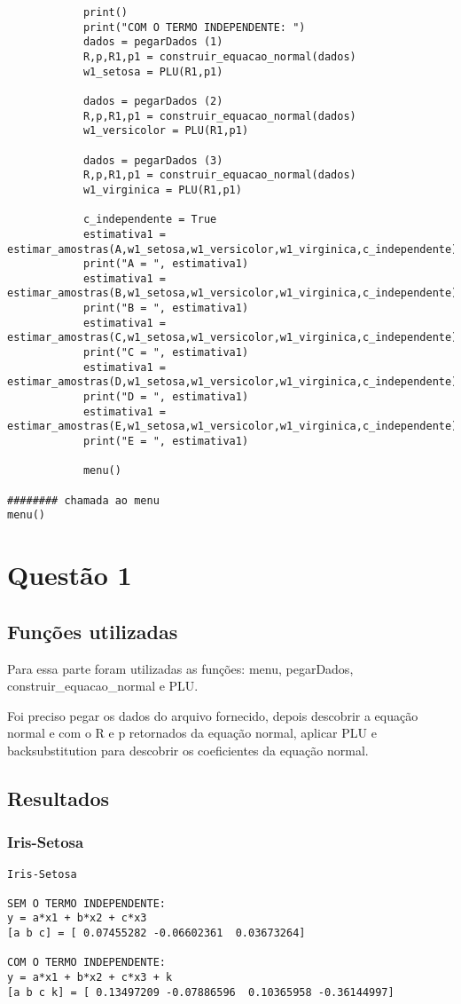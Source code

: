 \documentclass[a4paper,12pt,twoside]{article}
\begin{document}
\begin{lstlisting}
            print()
            print("COM O TERMO INDEPENDENTE: ")
            dados = pegarDados (1)
            R,p,R1,p1 = construir_equacao_normal(dados)
            w1_setosa = PLU(R1,p1)
            
            dados = pegarDados (2)
            R,p,R1,p1 = construir_equacao_normal(dados)
            w1_versicolor = PLU(R1,p1)
            
            dados = pegarDados (3)
            R,p,R1,p1 = construir_equacao_normal(dados)
            w1_virginica = PLU(R1,p1)
            
            c_independente = True
            estimativa1 = estimar_amostras(A,w1_setosa,w1_versicolor,w1_virginica,c_independente)
            print("A = ", estimativa1)
            estimativa1 = estimar_amostras(B,w1_setosa,w1_versicolor,w1_virginica,c_independente)
            print("B = ", estimativa1)
            estimativa1 = estimar_amostras(C,w1_setosa,w1_versicolor,w1_virginica,c_independente)
            print("C = ", estimativa1)
            estimativa1 = estimar_amostras(D,w1_setosa,w1_versicolor,w1_virginica,c_independente)
            print("D = ", estimativa1)
            estimativa1 = estimar_amostras(E,w1_setosa,w1_versicolor,w1_virginica,c_independente)
            print("E = ", estimativa1)
            
            menu()
                       
######## chamada ao menu
menu()

\end{lstlisting}

\section{Questão 1}
\subsection{Funções utilizadas}
Para essa parte foram utilizadas as funções: menu, pegarDados, construir\_equacao\_normal e PLU.

Foi preciso pegar os dados do arquivo fornecido, depois descobrir a equação normal e com o R e p retornados da equação normal, aplicar PLU e backsubstitution para descobrir os coeficientes da equação normal.

\subsection{Resultados}
\subsubsection{Iris-Setosa}
\begin{lstlisting}
Iris-Setosa

SEM O TERMO INDEPENDENTE: 
y = a*x1 + b*x2 + c*x3
[a b c] = [ 0.07455282 -0.06602361  0.03673264]

COM O TERMO INDEPENDENTE: 
y = a*x1 + b*x2 + c*x3 + k
[a b c k] = [ 0.13497209 -0.07886596  0.10365958 -0.36144997]
\end{lstlisting}
\end{document}
